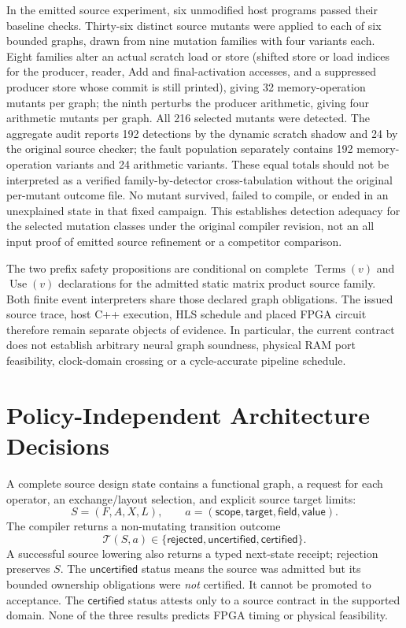 \documentclass{article}
\newcommand{\cert}{\mathsf{certified}}
\newcommand{\reject}{\mathsf{rejected}}
\newcommand{\unknown}{\mathsf{uncertified}}
\begin{document}
In the emitted source experiment, six unmodified host programs passed their baseline checks. Thirty-six distinct source mutants were applied to each of six bounded graphs, drawn from nine mutation families with four variants each. Eight families alter an actual scratch load or store (shifted store or load indices for the producer, reader, Add and final-activation accesses, and a suppressed producer store whose commit is still printed), giving 32 memory-operation mutants per graph; the ninth perturbs the producer arithmetic, giving four arithmetic mutants per graph. All 216 selected mutants were detected. The aggregate audit reports 192 detections by the dynamic scratch shadow and 24 by the original source checker; the fault population separately contains 192 memory-operation variants and 24 arithmetic variants. These equal totals should not be interpreted as a verified family-by-detector cross-tabulation without the original per-mutant outcome file. No mutant survived, failed to compile, or ended in an unexplained state in that fixed campaign. This establishes detection adequacy for the selected mutation classes under the original compiler revision, not an all input proof of emitted source refinement or a competitor comparison.


The two prefix safety propositions are conditional on complete $\operatorname{Terms}(v)$ and $\operatorname{Use}(v)$ declarations for the admitted static matrix product source family. Both finite event interpreters share those declared graph obligations. The issued source trace, host C++ execution, HLS schedule and placed FPGA circuit therefore remain separate objects of evidence. In particular, the current contract does not establish arbitrary neural graph soundness, physical RAM port feasibility, clock-domain crossing or a cycle-accurate pipeline schedule.

\section{Policy-Independent Architecture Decisions}
\label{sec:decisions}

A complete source design state contains a functional graph, a request for each operator, an exchange/layout selection, and explicit source target limits:
\begin{equation}
S=(F,A,X,L),\qquad a=(\mathsf{scope},\mathsf{target},\mathsf{field},\mathsf{value}).
\label{eq:state}
\end{equation}
The compiler returns a non-mutating transition outcome
\begin{equation}
\mathcal{T}(S,a)\in\{\reject,\unknown,\cert\}.
\label{eq:transition}
\end{equation}
A successful source lowering also returns a typed next-state receipt; rejection preserves $S$. The $\unknown$ status means the source was admitted but its bounded ownership obligations were \emph{not} certified. It cannot be promoted to acceptance. The $\cert$ status attests only to a source contract in the supported domain. None of the three results predicts FPGA timing or physical feasibility.
\end{document}
